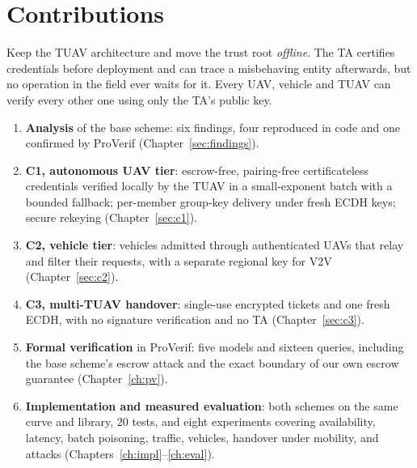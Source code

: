 \section{Contributions}
\begin{keybox}
Keep the TUAV architecture and move the trust root \emph{offline}. The TA certifies credentials before deployment and can trace a misbehaving entity
afterwards, but no operation in the field ever waits for it. Every UAV, vehicle and TUAV can verify every other one using only the TA's public key.
\end{keybox}
\begin{enumerate}[label=\textbf{\arabic*.},leftmargin=*]
  \item \textbf{Analysis} of the base scheme: six findings, four reproduced in code and one confirmed by ProVerif (Chapter~\ref{sec:findings}).
  \item \textcolor{uavc}{\textbf{C1, autonomous UAV tier}}: escrow-free, pairing-free certificateless credentials verified locally by the TUAV in a
        small-exponent batch with a bounded fallback; per-member group-key delivery under fresh ECDH keys; secure rekeying (Chapter~\ref{sec:c1}).
  \item \textcolor{vehc}{\textbf{C2, vehicle tier}}: vehicles admitted through authenticated UAVs that relay and filter their requests, with a separate
        regional key for V2V (Chapter~\ref{sec:c2}).
  \item \textcolor{hoc}{\textbf{C3, multi-TUAV handover}}: single-use encrypted tickets and one fresh ECDH, with no signature verification and no TA (Chapter~\ref{sec:c3}).
  \item \textbf{Formal verification} in ProVerif: five models and sixteen queries, including the base scheme's escrow attack and the exact boundary of our
        own escrow guarantee (Chapter~\ref{ch:pv}).
  \item \textbf{Implementation and measured evaluation}: both schemes on the same curve and library, 20 tests, and eight experiments covering
        availability, latency, batch poisoning, traffic, vehicles, handover under mobility, and attacks (Chapters~\ref{ch:impl}--\ref{ch:eval}).
\end{enumerate}

